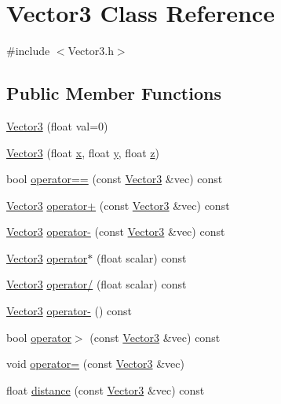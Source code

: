 \hypertarget{class_vector3}{}\section{Vector3 Class Reference}
\label{class_vector3}


{\ttfamily \#include $<$Vector3.\+h$>$}

\subsection*{Public Member Functions}
\begin{DoxyCompactItemize}
\item 
\hyperlink{class_vector3_a0e04c223104cd5f8089e8a34069e0d31}{Vector3} (float val=0)
\item 
\hyperlink{class_vector3_ad53e22b52babdb90d423601f72467590}{Vector3} (float \hyperlink{class_vector3_a7e2d3237b29a2f29d7b3d8b2934e35f2}{x}, float \hyperlink{class_vector3_a86eb35a9fa2d5a49e7fad66a35fa9c13}{y}, float \hyperlink{class_vector3_aa8c9461eb24bd2c364258078811a3e9d}{z})
\item 
bool \hyperlink{class_vector3_aea67111b0bc5b12c341145f84f3e2cff}{operator==} (const \hyperlink{class_vector3}{Vector3} \&vec) const
\item 
\hyperlink{class_vector3}{Vector3} \hyperlink{class_vector3_a87c9bc23295bebc6b36fd9b9c9abda67}{operator+} (const \hyperlink{class_vector3}{Vector3} \&vec) const
\item 
\hyperlink{class_vector3}{Vector3} \hyperlink{class_vector3_afb3734d29da79f12b1b02e0542433bd3}{operator-\/} (const \hyperlink{class_vector3}{Vector3} \&vec) const
\item 
\hyperlink{class_vector3}{Vector3} \hyperlink{class_vector3_ad572247e5bd9afab9d1639610f0b0ac6}{operator$\ast$} (float scalar) const
\item 
\hyperlink{class_vector3}{Vector3} \hyperlink{class_vector3_ad9ced662f4acf9c06de6655bd33ea683}{operator/} (float scalar) const
\item 
\hyperlink{class_vector3}{Vector3} \hyperlink{class_vector3_abf941de6e1724901c46d5e9e1448358f}{operator-\/} () const
\item 
bool \hyperlink{class_vector3_a4c506690133a1c5643734e23e7d69d5d}{operator$>$} (const \hyperlink{class_vector3}{Vector3} \&vec) const
\item 
void \hyperlink{class_vector3_a814c9ffea79062ce4d9ce902da1b6d05}{operator=} (const \hyperlink{class_vector3}{Vector3} \&vec)
\item 
float \hyperlink{class_vector3_a9dd2015e58d753dd4e3f1ba47eeaaf35}{distance} (const \hyperlink{class_vector3}{Vector3} \&vec) const
\end{DoxyCompactItemize}
